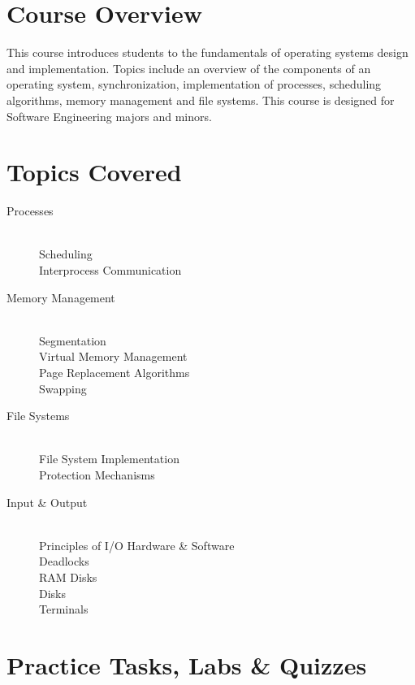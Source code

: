 \documentclass[12pt,a4paper,oneside]{article}
\begin{document}
    \section{Course Overview}

        This course introduces students to the fundamentals of operating systems
        design and implementation. Topics include an overview of the components
        of an operating system, synchronization, implementation of processes,
        scheduling algorithms, memory management and file systems. This course
        is designed for Software Engineering majors and minors.

    \section{Topics Covered}

        \begin{description}
            \item[Processes]\hfill\\
                Scheduling\\
                Interprocess Communication
            \item[Memory Management]\hfill\\
                Segmentation\\
                Virtual Memory Management\\
                Page Replacement Algorithms\\
                Swapping
            \item[File Systems]\hfill\\
                File System Implementation\\
                Protection Mechanisms
            \item[Input \& Output]\hfill\\
                Principles of I/O Hardware \& Software\\
                Deadlocks\\
                RAM Disks\\
                Disks\\
                Terminals
        \end{description}

    \section{Practice Tasks, Labs \& Quizzes}
\end{document}
